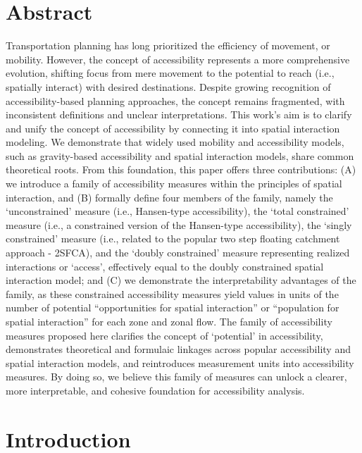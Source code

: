 \documentclass[
  10pt,
  letterpaper,
]{article}
\begin{document}
\section*{Abstract}
Transportation planning has long prioritized the efficiency of movement,
or mobility. However, the concept of accessibility represents a more
comprehensive evolution, shifting focus from mere movement to the
potential to reach (i.e., spatially interact) with desired destinations.
Despite growing recognition of accessibility-based planning approaches,
the concept remains fragmented, with inconsistent definitions and
unclear interpretations. This work's aim is to clarify and unify the
concept of accessibility by connecting it into spatial interaction
modeling. We demonstrate that widely used mobility and accessibility
models, such as gravity-based accessibility and spatial interaction
models, share common theoretical roots. From this foundation, this paper
offers three contributions: (A) we introduce a family of accessibility
measures within the principles of spatial interaction, and (B) formally
define four members of the family, namely the `unconstrained' measure
(i.e., Hansen-type accessibility), the `total constrained' measure
(i.e., a constrained version of the Hansen-type accessibility), the
`singly constrained' measure (i.e., related to the popular two step
floating catchment approach - 2SFCA), and the `doubly constrained'
measure representing realized interactions or `access', effectively
equal to the doubly constrained spatial interaction model; and (C) we
demonstrate the interpretability advantages of the family, as these
constrained accessibility measures yield values in units of the number
of potential ``opportunities for spatial interaction'' or ``population
for spatial interaction'' for each zone and zonal flow. The family of
accessibility measures proposed here clarifies the concept of
`potential' in accessibility, demonstrates theoretical and formulaic
linkages across popular accessibility and spatial interaction models,
and reintroduces measurement units into accessibility measures. By doing
so, we believe this family of measures can unlock a clearer, more
interpretable, and cohesive foundation for accessibility analysis.


\linenumbers

\section{Introduction}\label{introduction}
\end{document}
